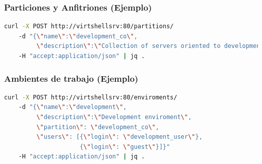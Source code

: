 \documentclass[xcolor=dvipsnames]{beamer} %
\begin{document}
\begin{frame}[fragile]
\frametitle{Particiones y Anfitriones (Ejemplo)}
\begin{lstlisting}[language=Bash,basicstyle=\ttfamily\scriptsize,keywordstyle=\color{blue}]
curl -X POST http://virtshellsrv:80/partitions/ 
    -d "{\"name\":\"development_co\",
         \"description\":\"Collection of servers oriented to development team in Colombia.\"}" 
    -H "accept:application/json" | jq .
\end{lstlisting}
\end{frame}



\begin{frame}[fragile]
\frametitle{Ambientes de trabajo (Ejemplo)}
\begin{lstlisting}[language=Bash,basicstyle=\ttfamily\scriptsize,keywordstyle=\color{blue}]
curl -X POST http://virtshellsrv:80/enviroments/ 
    -d "{\"name\":\"development\",
         \"description\":\"Development enviroment\", 
         \"partition\": \"development_co\", 
         \"users\": [{\"login\": \"development_user\"}, 
                     {\"login\": \"guest\"}]}" 
    -H "accept:application/json" | jq .
\end{lstlisting}
\end{frame}




\end{document}
